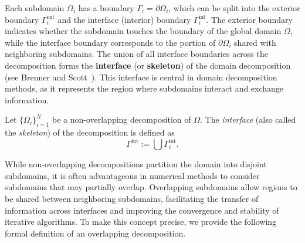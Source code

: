 \noindent Each subdomain $\Omega_i$ has a boundary $\Gamma_i = \partial \Omega_i$, which can be split into the exterior boundary $\Gamma_i^{\text{ext}}$ and the interface (interior) boundary $\Gamma_i^{\text{int}}$.  
The exterior boundary indicates whether the subdomain touches the boundary of the global domain $\Omega$, while the interface boundary corresponds to the portion of $\partial \Omega_i$ shared with neighboring subdomains. The union of all interface boundaries across the decomposition forms the \textbf{interface} (or \textbf{skeleton}) of the domain decomposition (see Brenner and Scott~\cite{BrennerScott2008}). This interface is central in domain decomposition methods, as it represents the region where subdomains interact and exchange information.
\begin{definition}
Let $\{\Omega_i\}_{i=1}^N$ be a non-overlapping decomposition of $\Omega$. The \textit{interface} (also called the \textit{skeleton}) of the decomposition is defined as
\begin{equation*}
    \Gamma^{\text{int}} := \bigcup\Gamma_{i}^{\text{int}}.
\end{equation*}
\end{definition}
\noindent While non-overlapping decompositions partition the domain into disjoint subdomains, it is often advantageous in numerical methods to consider subdomains that may partially overlap. Overlapping subdomains allow regions to be shared between neighboring subdomains, facilitating the transfer of information across interfaces and improving the convergence and stability of iterative algorithms. To make this concept precise, we provide the following formal definition of an overlapping decomposition.

